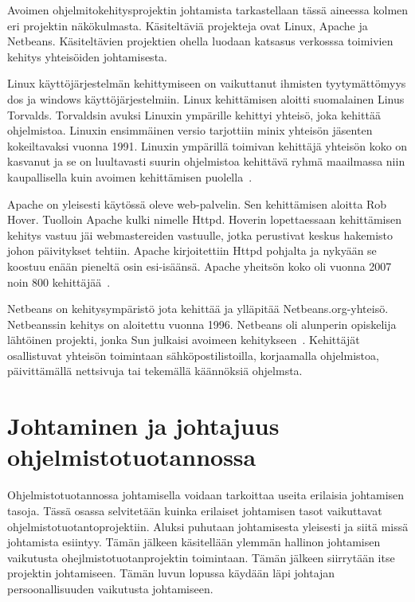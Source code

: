 \documentclass[finnish]{tktltiki2}
\theoremstyle{definition}
\theoremstyle{remark}
\begin{document}
Avoimen ohjelmitokehitysprojektin johtamista tarkastellaan tässä aineessa kolmen eri projektin näkökulmasta. Käsiteltäviä projekteja ovat Linux, Apache ja Netbeans. Käsiteltävien projektien ohella luodaan katsasus verkosssa toimivien kehitys yhteisöiden johtamisesta. 


Linux käyttöjärjestelmän kehittymiseen on vaikuttanut ihmisten tyytymättömyys dos ja windows käyttöjärjestelmiin. Linux kehittämisen aloitti suomalainen Linus Torvalds. Torvaldsin avuksi Linuxin ympärille kehittyi yhteisö, joka kehittää ohjelmistoa. Linuxin ensimmäinen versio tarjottiin minix yhteisön jäsenten kokeiltavaksi vuonna 1991. Linuxin ympärillä toimivan kehittäjä yhteisön koko on kasvanut ja se on luultavasti suurin ohjelmistoa kehittävä ryhmä maailmassa niin kaupallisella kuin avoimen kehittämisen puolella~\cite{conlon2007examination}. 

Apache on yleisesti käytössä oleve web-palvelin. Sen kehittämisen aloitta Rob Hover. Tuolloin Apache kulki nimelle Httpd. Hoverin lopettaessaan kehittämisen kehitys vastuu jäi webmastereiden vastuulle, jotka perustivat keskus hakemisto johon päivitykset tehtiin. Apache kirjoitettiin Httpd pohjalta ja nykyään se koostuu enään pieneltä osin esi-isäänsä. Apache yheitsön koko oli vuonna 2007 noin 800 kehittäjää~\cite{conlon2007examination}.

Netbeans on kehitysympäristö jota kehittää ja ylläpitää Netbeans.org-yhteisö. Netbeanssin kehitys on aloitettu vuonna 1996. Netbeans oli alunperin opiskelija lähtöinen projekti,  jonka  Sun julkaisi avoimeen kehitykseen~\cite{1385637}. Kehittäjät osallistuvat yhteisön toimintaan sähköpostilistoilla, korjaamalla ohjelmistoa, päivittämällä nettsivuja tai tekemällä käännöksiä ohjelmsta. 

\section{Johtaminen ja johtajuus ohjelmistotuotannossa}

Ohjelmistotuotannossa johtamisella voidaan tarkoittaa useita erilaisia johtamisen tasoja. Tässä osassa selvitetään kuinka erilaiset johtamisen tasot vaikuttavat ohjelmistotuotantoprojektiin. Aluksi puhutaan johtamisesta yleisesti ja siitä missä johtamista esiintyy. Tämän jälkeen käsitellään ylemmän hallinon johtamisen vaikutusta ohejlmistotuotanprojektin toimintaan. Tämän jälkeen siirrytään itse projektin johtamiseen. Tämän luvun lopussa käydään läpi johtajan persoonallisuuden vaikutusta johtamiseen.
\end{document}
